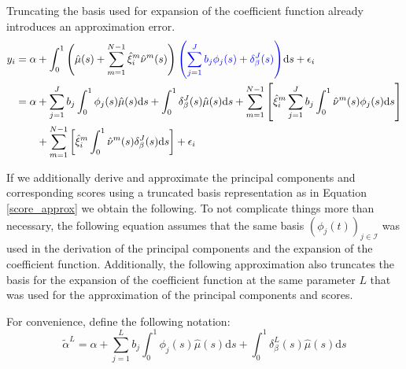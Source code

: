 \documentclass[11pt,twoside,a4paper]{article}
\begin{document}
	Truncating the basis used for expansion of the coefficient function already introduces an approximation error.
	\begin{equation}\label{fpcr_reg_both_expansions}
		\begin{split}
			y_i &= \alpha + \int_{0}^{1} \left(\hat{\mu}(s) + \sum_{m = 1}^{N-1} \hat{\xi}^{m}_i \hat{\nu}^{m}(s)\right) {\color{blue}\left(\sum_{j = 1}^{J} b_j \phi_j(s) + \delta_{\beta}^{J}(s)\right)} \mathrm{d}s + \epsilon_i\\
			&= \alpha + \sum_{j = 1}^{J} b_j \int_{0}^{1} \phi_j(s) \hat{\mu}(s) \mathrm{d}s + \int_{0}^{1} \delta_{\beta}^{J}(s) \hat{\mu}(s) \mathrm{d}s + \sum_{m = 1}^{N-1} \left[ \hat{\xi}^m_i \sum_{j = 1}^{J} b_j \int_{0}^{1}\hat{\nu}^m(s) \phi_j(s) \mathrm{d}s \right] \\
			& \quad \quad + \sum_{m = 1}^{N-1} \left[ \hat{\xi}^m_i \int_{0}^{1}\hat{\nu}^m(s) \delta_{\beta}^{J}(s) \mathrm{d}s \right] + \epsilon_i
		\end{split}
	\end{equation}

	If we additionally derive and approximate the principal components and corresponding scores using a truncated basis representation as in Equation \ref{score_approx} we obtain the following. To not complicate things more than necessary, the following equation assumes that the same basis $\left(\phi_j(t)\right)_{j \in \mathcal{I}}$ was used in the derivation of the principal components and the expansion of the coefficient function. Additionally, the following approximation also truncates the basis for the expansion of the coefficient function at the same parameter $L$ that was used for the approximation of the principal components and scores.
	
	For convenience, define the following notation:
	\begin{equation}
		\tilde{\alpha}^L = \alpha + \sum_{j = 1}^{L} b_j \int_{0}^{1} \phi_j(s) \hat{\mu}(s) \mathrm{d}s + \int_{0}^{1} \delta_{\beta}^{L}(s) \hat{\mu}(s) \mathrm{d}s
	\end{equation}
	
\end{document}
